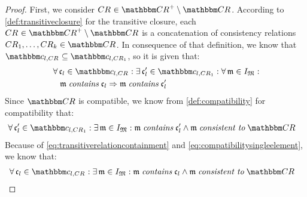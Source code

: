 \begin{proof}
    First, we consider $\consistencyrelation{CR}{} \in \transitiveclosure{\consistencyrelationset{CR}} \setminus \consistencyrelationset{CR}$.
    According to \autoref{def:transitiveclosure} for the transitive closure, each $\consistencyrelation{CR}{} \in \transitiveclosure{\consistencyrelationset{CR}} \setminus \consistencyrelationset{CR}$ is a concatenation of consistency relations $\consistencyrelation{CR}{1}, \dots, \consistencyrelation{CR}{k} \in \consistencyrelationset{CR}$.
    In consequence of that definition, we know that $\condition{c}{l,\consistencyrelation{CR}{}} \subseteq \condition{c}{l,\consistencyrelation{CR}{1}}$, so it is given that:
    \begin{align}
        & \nonumber \label{eq:transitiverelationcontainment}
        \forall \conditionelement{c}{l} \in \condition{c}{l,\consistencyrelation{CR}{}} : \exists \conditionelement{c}{l}' \in \condition{c}{l,\consistencyrelation{CR}{1}} : \forall \modeltuple{m} \in \metamodeltupleinstanceset{M} : \\ 
        & \formulaskip
        \modeltuple{m} \containsmath \conditionelement{c}{l} \Rightarrow \modeltuple{m} \containsmath \conditionelement{c}{l}'
    \end{align}
    Since $\consistencyrelationset{CR}$ is compatible, we know from \autoref{def:compatibility} for compatibility that:
    \begin{align}
        & %
        \label{eq:compatibilitysingleelement}
        \forall \conditionelement{c}{l}' \in \condition{c}{l, \consistencyrelation{CR}{1}} %
        : \exists \modeltuple{m} \in \metamodeltupleinstanceset{M} : %
        \modeltuple{m} \containsmath \conditionelement{c}{l}' \land \modeltuple{m} \consistenttomath \consistencyrelationset{CR}
    \end{align}
    Because of \autoref{eq:transitiverelationcontainment} and \autoref{eq:compatibilitysingleelement}, we know that:
    \begin{align}
        & %
        \label{eq:compatibilitysinglelementtransitive}
        \forall \conditionelement{c}{l} \in \condition{c}{l, \consistencyrelation{CR}{}} %
        : \exists \modeltuple{m} \in \metamodeltupleinstanceset{M} : %
        \modeltuple{m} \containsmath \conditionelement{c}{l} \land \modeltuple{m} \consistenttomath \consistencyrelationset{CR}

\end{align}
\end{proof}
